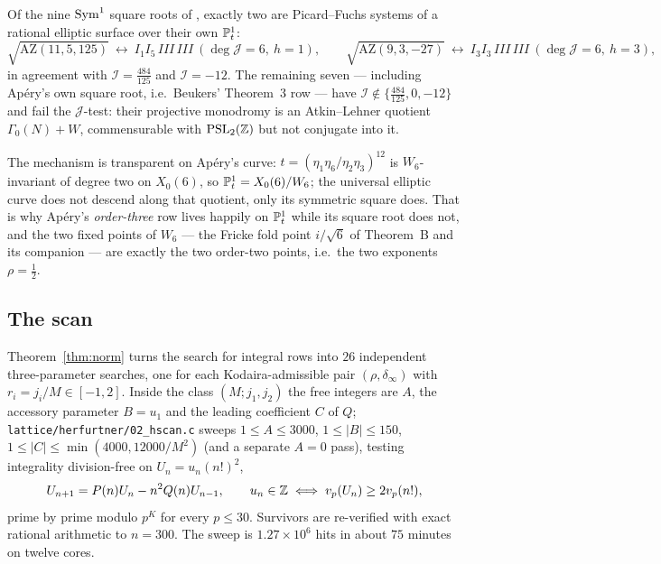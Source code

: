 \begin{theorem}\label{thm:whichroots}
 Of the nine $\operatorname{Sym}^1$ square roots of
\cite[\S7--8]{ProjSporadicScan2}, exactly two are Picard--Fuchs systems of a
rational elliptic surface over their own $\mathbb{P}^1_t$:
\[
\sqrt{\mathrm{AZ}(11,5,125)}\ \leftrightarrow\ I_1I_5\,III\,III\ (\deg\mathcal J=6,\ h=1),
\qquad
\sqrt{\mathrm{AZ}(9,3,-27)}\ \leftrightarrow\ I_3I_3\,III\,III\ (\deg\mathcal J=6,\ h=3),
\]
in agreement with $\mathcal I=\tfrac{484}{125}$ and $\mathcal I=-12$. The
remaining seven --- including Apéry's own square root, i.e.\ Beukers' Theorem~3
row --- have $\mathcal I\notin\{\tfrac{484}{125},0,-12\}$ and fail the
$\mathcal J$-test: their projective monodromy is an Atkin--Lehner quotient
$\Gamma_0(N)+W$, commensurable with $\operatorname{PSL}_2(\mathbb{Z})$ but not conjugate into it.
\end{theorem}

The mechanism is transparent on Apéry's curve: $t=(\eta_1\eta_6/\eta_2\eta_3)^{12}$
is $W_6$-invariant of degree two on $X_0(6)$, so $\mathbb{P}^1_t=X_0(6)/W_6$; the
universal elliptic curve does not descend along that quotient, only its
symmetric square does. That is why Apéry's \emph{order-three} row lives happily on
$\mathbb{P}^1_t$ while its square root does not, and the two fixed points of $W_6$ ---
the Fricke fold point $i/\sqrt6$ of Theorem~B and its companion --- are exactly
the two order-two points, i.e.\ the two exponents $\rho=\tfrac12$.

\subsection{The scan}\label{sec:herfscan}

Theorem~\ref{thm:norm} turns the search for integral rows into $26$ independent
three-parameter searches, one for each Kodaira-admissible pair
$(\rho,\delta_\infty)$ with $r_i=j_i/M\in[-1,2]$. Inside the class $(M;j_1,j_2)$
the free integers are $A$, the accessory parameter $B=u_1$ and the leading
coefficient $C$ of $Q$; \texttt{lattice/herfurtner/02\_hscan.c} sweeps
$1\le A\le3000$, $1\le|B|\le150$, $1\le|C|\le\min(4000,12000/M^2)$ (and a
separate $A=0$ pass), testing integrality division-free on $U_n=u_n(n!)^2$,
\[
U_{n+1}=P(n)U_n-n^2Q(n)U_{n-1},\qquad u_n\in\mathbb{Z}\iff v_p(U_n)\ge2v_p(n!),
\]
prime by prime modulo $p^K$ for every $p\le30$. Survivors are re-verified with
exact rational arithmetic to $n=300$. The sweep is $1.27\times10^6$ hits in
about $75$ minutes on twelve cores.

